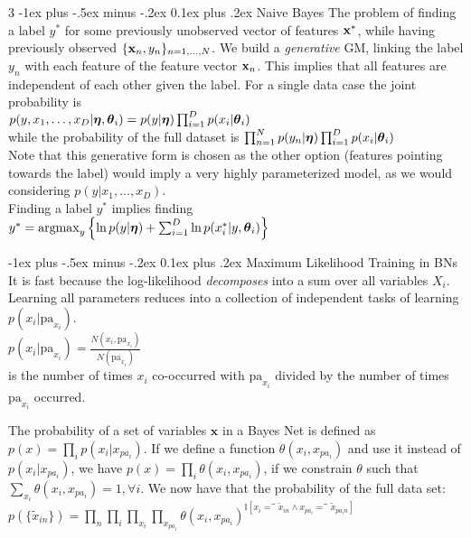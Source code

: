 \documentclass[a4paper,landscape]{amsmlaj}
\makeatletter
\renewcommand{\subsection}{\@startsection{subsection}{2}{0mm}
	{-1ex plus -.5ex minus -.2ex}
	{0.1ex plus .2ex}
	{\normalfont\normalsize\bfseries}}
\makeatother
\begin{document}
\begin{multicols*}{3}
\subsection{Naive Bayes}
The problem of finding a label $y^*$ for some previously unobserved vector of
features $\bm{\mathbf{x}}^*$, while having previously observed $\{\bm{\mathbf{x}}_n,y_n\}_{n=1,\ldots,N}$.
We build a \textit{generative} GM, linking the label $y_n$ with each feature of
the feature vector $\bm{\mathbf{x}}_n$. This implies that all features are independent of
each other given the label. For a single data case the joint probability is \\
$p(y,x_1,\ldots,x_D|\bm{\mathbf{\eta}},\bm{\mathbf{\theta}}_i)=p(y|\bm{\mathbf{\eta}})\prod_{i=1}^D p(x_i|\bm{\mathbf{\theta}}_i)$ \\
while the probability of the full dataset is
$\prod_{n=1}^N p(y_n|\bm{\mathbf{\eta}})\prod_{i=1}^D p(x_i|\bm{\mathbf{\theta}}_i)$ \\
Note that this generative form is chosen as the other option (features pointing
towards the label) would imply a very highly parameterized model, as we would
considering $p(y|x_1,\ldots,x_D)$. \\
Finding a label $y^*$ implies finding \\
$y^*=\argmax_y\left\{ \ln p(y|\vt{\eta})+\sum_{i=1}^D \ln p(x_i^*|y,\vt{\theta}_i) \right\}$

\subsection{Maximum Likelihood Training in BNs}
It is fast because the log-likelihood \textit{decomposes} into a sum over all
variables $X_i$. Learning all parameters reduces into a collection of
independent tasks of learning $p(x_i|\text{pa}_{x_i})$. \\
$p(x_i|\text{pa}_{x_i})=\frac{N(x_i,\text{pa}_{x_i})}{N(\text{pa}_{x_i})}$ \\
is the number of times $x_i$ co-occurred with $\text{pa}_{x_i}$ divided by the
number of times $\text{pa}_{x_i}$ occurred.

The probability of a set of variables $\mathbf{x}$ in a Bayes Net is defined as
$p(x) = \prod_i p(x_i|x_{pa_i})$. If we define a function $\theta(x_i,
x_{pa_i})$ and use it instead of $p(x_i |x_{pa_i})$, we have $p(x) = \prod_i
\theta(x_i, x_{pa_i})$, if we constrain $\theta$ such that $\sum_{x_i}
\theta(x_i , x_{pa_i}) = 1, \forall i$.
We now have that the probability of the full data set:
$p(\{\widetilde x_{in}\}) = \prod_n \prod_i \prod_{x_i}
\prod_{x_{pa_{i}}} \theta(x_i, x_{pa_i})
^{\mathbb{I}[x_i = ̃\widetilde x_{in} \land x_{pa_i} = ̃\widetilde x_{pa_in}]}$


\end{multicols*}
\end{document}
